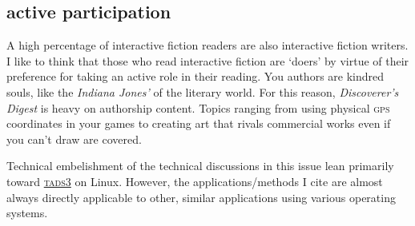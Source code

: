 \subsection{active participation}
\label{sec:purpose}
\normalmarginpar

A high percentage of interactive fiction readers are also interactive fiction
writers. I like to think that those who read interactive fiction are `doers' by
virtue of their preference for taking an active role in their reading. You
authors are kindred souls, like the \emph{Indiana Jones'} of the literary world.
For this reason, \emph{Discoverer's Digest} is heavy on authorship content.
Topics ranging from using physical \textsc{gps} coordinates in your games to creating art that rivals commercial works even if you can't draw are covered.

Technical embelishment of the technical discussions in this issue lean primarily toward
\href{http://www.tads.org/tads3.htm}{\textsc{tads3}} on Linux. However, the
applications/methods I cite are almost always directly applicable to other,
similar applications using various operating systems.

